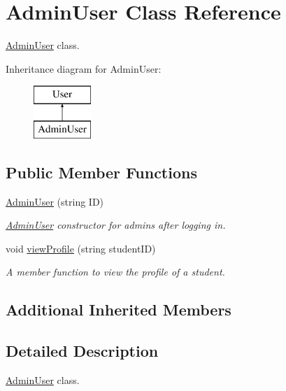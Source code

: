 \hypertarget{class_admin_user}{}\section{Admin\+User Class Reference}
\label{class_admin_user}


\hyperlink{class_admin_user}{Admin\+User} class.  


Inheritance diagram for Admin\+User\+:\begin{figure}[H]
\begin{center}
\leavevmode
\includegraphics[height=2.000000cm]{class_admin_user}
\end{center}
\end{figure}
\subsection*{Public Member Functions}
\begin{DoxyCompactItemize}
\item 
\hyperlink{class_admin_user_a0d2bb23705126f8f07af33c915a1c21c}{Admin\+User} (string I\+D)
\begin{DoxyCompactList}\small\item\em \hyperlink{class_admin_user}{Admin\+User} constructor for admins after logging in. \end{DoxyCompactList}\item 
void \hyperlink{class_admin_user_a3f481e9aecf194dad67b6a702ed18e41}{view\+Profile} (string student\+I\+D)
\begin{DoxyCompactList}\small\item\em A member function to view the profile of a student. \end{DoxyCompactList}\end{DoxyCompactItemize}
\subsection*{Additional Inherited Members}


\subsection{Detailed Description}
\hyperlink{class_admin_user}{Admin\+User} class. 

